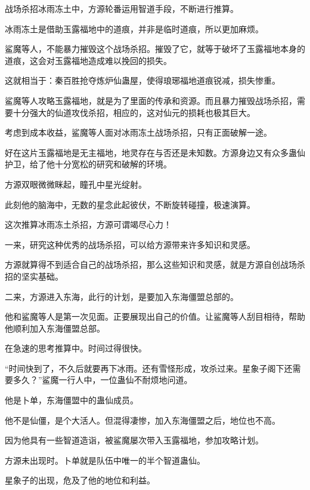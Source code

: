 
\begin{this_body}



战场杀招冰雨冻土中，方源轮番运用智道手段，不断进行推算。

冰雨冻土是借助玉露福地中的道痕，并非是临时道痕，所以更加麻烦。

鲨魔等人，不能暴力摧毁这个战场杀招。摧毁了它，就等于破坏了玉露福地本身的道痕，这会对玉露福地造成难以挽回的损失。

这就相当于：秦百胜抢夺炼炉仙蛊屋，使得琅琊福地道痕锐减，损失惨重。

鲨魔等人攻略玉露福地，就是为了里面的传承和资源。而且暴力摧毁战场杀招，需要十分强大的仙道攻伐杀招，相应的，这对仙元的损耗也极其巨大。

考虑到成本收益，鲨魔等人面对冰雨冻土战场杀招，只有正面破解一途。

好在这片玉露福地是无主福地，地灵存在与否还是未知数。方源身边又有众多蛊仙护卫，给了他十分宽松的研究和破解的环境。

方源双眼微微眯起，瞳孔中星光绽射。

此刻他的脑海中，无数的星念此起彼伏，不断旋转碰撞，极速演算。

这次推算冰雨冻土杀招，方源可谓竭尽心力！

一来，研究这种优秀的战场杀招，可以给方源带来许多知识和灵感。

方源就算得不到适合自己的战场杀招，那么这些知识和灵感，就是方源自创战场杀招的坚实基础。

二来，方源进入东海，此行的计划，是要加入东海僵盟总部的。

他和鲨魔等人是第一次见面。正要展现出自己的价值。让鲨魔等人刮目相待，帮助他顺利加入东海僵盟总部。

在急速的思考推算中。时间过得很快。

“时间快到了，不久后就要再下冰雨。还有雪怪形成，攻杀过来。星象子阁下还需要多久？”鲨魔一行人中，一位蛊仙不耐烦地问道。

他是卜单，东海僵盟中的蛊仙成员。

他不是仙僵，是个大活人。但混得凄惨，加入东海僵盟之后，地位也不高。

因为他具有一些智道造诣，被鲨魔屡次带入玉露福地，参加攻略计划。

方源未出现时。卜单就是队伍中唯一的半个智道蛊仙。

星象子的出现，危及了他的地位和利益。


\end{this_body}
